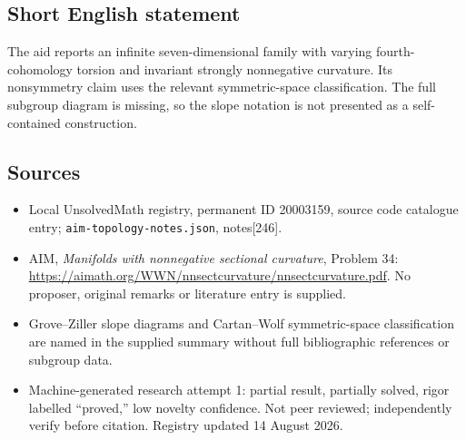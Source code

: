 \documentclass[11pt]{article}
\begin{document}
\subsection{Short English statement}
The aid reports an infinite seven-dimensional family with varying fourth-cohomology torsion and invariant strongly nonnegative curvature. Its nonsymmetry claim uses the relevant symmetric-space classification. The full subgroup diagram is missing, so the slope notation is not presented as a self-contained construction.
\subsection{Sources}
\begin{itemize}
\item Local UnsolvedMath registry, permanent ID 20003159, source code catalogue entry; \texttt{aim-topology-notes.json}, notes[246].
\item AIM, \emph{Manifolds with nonnegative sectional curvature}, Problem 34: \url{https://aimath.org/WWN/nnsectcurvature/nnsectcurvature.pdf}. No proposer, original remarks or literature entry is supplied.
\item Grove--Ziller slope diagrams and Cartan--Wolf symmetric-space classification are named in the supplied summary without full bibliographic references or subgroup data.
\item Machine-generated research attempt 1: partial result, partially solved, rigor labelled ``proved,'' low novelty confidence. Not peer reviewed; independently verify before citation. Registry updated 14 August 2026.
\end{itemize}
\end{document}
